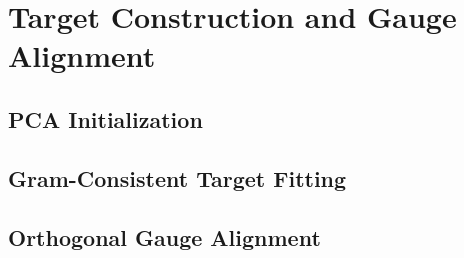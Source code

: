 \section{Target Construction and Gauge Alignment}
\label{app:target-construction}

\subsection{PCA Initialization}
\label{app:pca}

\subsection{Gram-Consistent Target Fitting}
\label{app:gram-fitting}

\subsection{Orthogonal Gauge Alignment}
\label{app:gauge-alignment}
